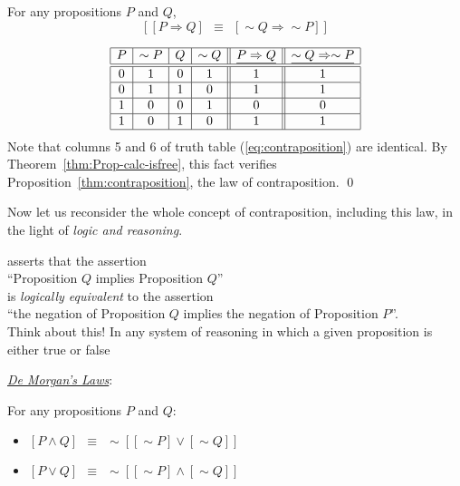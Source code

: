 \begin{prop}
\label{thm:contraposition}
For any propositions $P$ and $Q$,
\[  \left[ [ P \Rightarrow Q ] \ \ \equiv \ \ [ \sim Q
    \Rightarrow \sim P ] \right]
\]
\end{prop}

\begin{equation}
\label{eq:contraposition}
\begin{array}{|c|c|c|c||c||c|}
\hline
P & \sim P & Q & \sim Q & \underline{P \Rightarrow Q}
 & \underline{\sim Q \Rightarrow \sim P} \\
\hline
\hline
0 & 1 & 0 & 1 & 1 & 1 \\
\hline
0 & 1 & 1 & 0 & 1 & 1 \\
\hline
1 & 0 & 0 & 1 & 0 & 0 \\
\hline
1 & 0 & 1 & 0 & 1 & 1 \\
\hline
\end{array}
\end{equation}
Note that columns 5 and 6 of truth table (\ref{eq:contraposition}) are
identical.  By Theorem~\ref{thm:Prop-calc-isfree}, this fact verifies
Proposition~\ref{thm:contraposition}, the law of contraposition.
\qed

\smallskip

Now let us reconsider the whole concept of contraposition, including
this law, in the light of {\em logic and reasoning}.

 asserts that the assertion \\
\hspace*{.35in}
``Proposition $Q$ implies Proposition $Q$'' \\
is {\em logically equivalent} to the assertion \\
\hspace*{.35in}
``the negation of Proposition $Q$ implies the negation of Proposition
$P$''.  \\
Think about this!  In any system of reasoning in which a given
proposition is either {\small\sf true} or {\small\sf false} 





\bigskip

\noindent 
\underline{\it De Morgan's Laws}:

\begin{prop}
\label{thm:De-Morgan}
For any propositions $P$ and $Q$:
\begin{itemize}
\item
$[ P \wedge Q ] \ \ \equiv \ \ \sim [ [\sim P] \vee [\sim Q]]$
\item
$[ P \vee Q ] \ \ \equiv \ \ \sim [ [\sim P] \wedge [\sim Q]]$
\end{itemize}
\end{prop}

